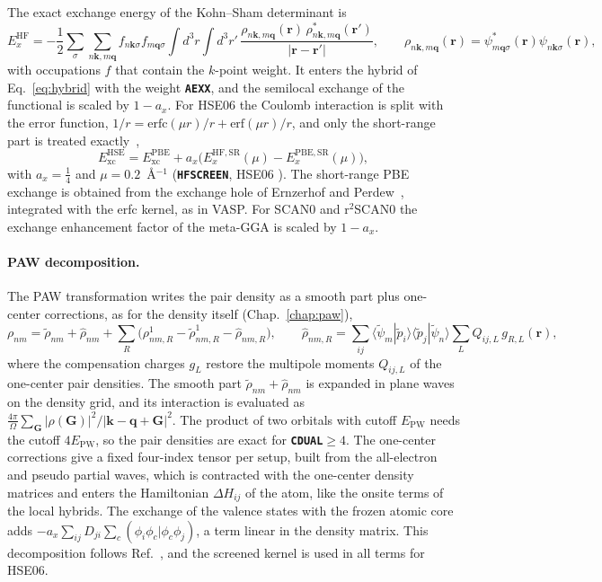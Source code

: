 \documentclass[11pt,a4paper,oneside]{book}
\newcommand{\key}[1]{\textbf{\texttt{#1}}}
\newcommand{\braket}[2]{\langle #1|#2\rangle}
\newcommand{\pt}{\tilde p}
\begin{document}
The exact exchange energy of the Kohn--Sham determinant is
\begin{equation}
  E_x^{\mathrm{HF}}=-\frac12\sum_\sigma\sum_{n\bm k,m\bm q}
  f_{n\bm k\sigma}f_{m\bm q\sigma}
  \int d^3r\int d^3r'\,
  \frac{\rho_{n\bm k,m\bm q}(\bm r)\,\rho^*_{n\bm k,m\bm q}(\bm r')}
       {|\bm r-\bm r'|},
  \qquad
  \rho_{n\bm k,m\bm q}(\bm r)=\psi^*_{m\bm q\sigma}(\bm r)\psi_{n\bm k\sigma}(\bm r),
  \label{eq:ehf}
\end{equation}
with occupations $f$ that contain the $k$-point weight. It enters the
hybrid of Eq.~\eqref{eq:hybrid} with the weight \key{AEXX}, and the
semilocal exchange of the functional is scaled by $1-a_x$. For HSE06 the
Coulomb interaction is split with the error function,
$1/r=\mathrm{erfc}(\mu r)/r+\mathrm{erf}(\mu r)/r$, and only the
short-range part is treated exactly~\cite{heyd03_jcp118_8207},
\begin{equation}
  E_{\mathrm{xc}}^{\mathrm{HSE}}=E_{\mathrm{xc}}^{\mathrm{PBE}}
  +a_x\bigl(E_x^{\mathrm{HF,SR}}(\mu)-E_x^{\mathrm{PBE,SR}}(\mu)\bigr),
\end{equation}
with $a_x=\frac14$ and $\mu=0.2$~\AA$^{-1}$ (\key{HFSCREEN}, HSE06
\cite{krukau06_jcp125_224106}). The short-range PBE exchange is obtained
from the exchange hole of Ernzerhof and Perdew~\cite{ernzerhof98_jcp109_3313},
integrated with the erfc kernel, as in VASP. For SCAN0 and r$^2$SCAN0
the exchange enhancement factor of the meta-GGA is scaled by $1-a_x$.

\paragraph{PAW decomposition.} The PAW transformation writes the pair
density as a smooth part plus one-center corrections, as for the
density itself (Chap.~\ref{chap:paw}),
\begin{equation}
  \rho_{nm}=\tilde\rho_{nm}+\hat\rho_{nm}
  +\sum_R\bigl(\rho^1_{nm,R}-\tilde\rho^1_{nm,R}-\hat\rho_{nm,R}\bigr),
  \qquad
  \hat\rho_{nm,R}=\sum_{ij}\braket{\tilde\psi_m}{\pt_i}\braket{\pt_j}{\tilde\psi_n}
  \sum_L Q_{ij,L}\,g_{R,L}(\bm r),
\end{equation}
where the compensation charges $g_L$ restore the multipole moments
$Q_{ij,L}$ of the one-center pair densities. The smooth part
$\tilde\rho_{nm}+\hat\rho_{nm}$ is expanded in plane waves on the density
grid, and its interaction is evaluated as
$\frac{4\pi}{\Omega}\sum_{\bm G}|\rho(\bm G)|^2/|\bm k-\bm q+\bm G|^2$.
The product of two orbitals with cutoff $E_{\mathrm{PW}}$ needs the
cutoff $4E_{\mathrm{PW}}$, so the pair densities are exact for
\key{CDUAL}$\ge4$. The one-center corrections give a fixed
four-index tensor per setup, built from the all-electron and pseudo
partial waves, which is contracted with the one-center density
matrices and enters the Hamiltonian $\Delta H_{ij}$ of the atom, like
the onsite terms of the local hybrids. The exchange of the valence
states with the frozen atomic core adds
$-a_x\sum_{ij}D_{ji}\sum_c(\phi_i\phi_c|\phi_c\phi_j)$, a term linear in
the density matrix. This decomposition follows
Ref.~\cite{paier05_jcp122_234102}, and the screened kernel is used in
all terms for HSE06.
\end{document}
